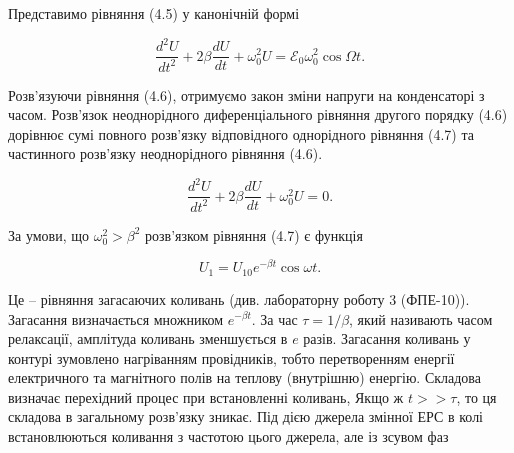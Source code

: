 \documentclass[12pt, a4paper]{article}
\begin{document}
    Представимо рівняння (4.5) у канонічній формі

    \vspace{0.5em}

    \begin{equation}
        \frac{d^2U}{dt^2} + 2\beta \frac{dU}{dt} + \omega_0^2 U = \mathcal{E}_0 \omega_0^2 \cos \Omega t.
        \tag{4.6}
    \end{equation}

    \vspace{0.5em}

    Розв’язуючи рівняння (4.6), отримуємо закон зміни напруги на конденсаторі з часом. Розв’язок неоднорідного диференціального рівняння другого порядку (4.6) дорівнює сумі повного розв’язку відповідного однорідного рівняння (4.7) та частинного розв’язку неоднорідного
    рівняння (4.6).

    \vspace{0.5em}

    \begin{equation}
        \frac{d^2U}{dt^2} + 2 \beta \frac{dU}{dt} + \omega_0^2 U = 0.
        \tag{4.7}
    \end{equation}

    \vspace{0.5em}

    За умови, що $\omega_0^2 > \beta^2$ розв’язком рівняння (4.7) є функція

    \vspace{0.5em}

    \begin{equation}
        U_1 = U_{10} e^{-\beta t} \cos \omega t.
        \tag{4.8}
    \end{equation}

    \vspace{0.5em}

    Це – рівняння загасаючих коливань
    (див. лабораторну роботу 3 (ФПЕ-10)).
    Загасання визначається множником $e^{-\beta t}$.
    За час $\tau = 1/\beta$, який називають часом релаксації,
    амплітуда коливань зменшується в $e$ разів.
    Загасання коливань у контурі зумовлено нагріванням провідників,
    тобто перетворенням енергії електричного та магнітного полів
    на теплову (внутрішню) енергію.
    Складова визначає перехідний процес при встановленні коливань,
    Якщо ж $t >> \tau$, то ця складова в загальному розв’язку зникає.
    Під дією джерела змінної ЕРС в колі встановлюються коливання
    з частотою цього джерела, але із зсувом фаз
\end{document}
